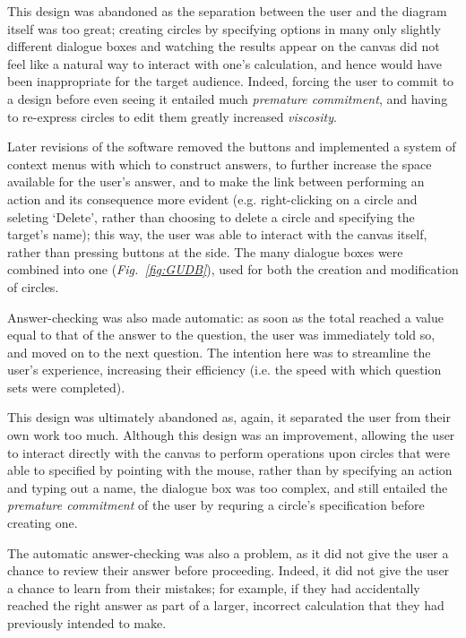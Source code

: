 \documentclass[12pt,twoside,notitlepage,xetex]{report}
\begin{document}
This design was abandoned as the separation between the user and the diagram itself was too great; creating circles by specifying options in many only slightly different dialogue boxes and watching the results appear on the canvas did not feel like a natural way to interact with one's calculation, and hence would have been inappropriate for the target audience.  Indeed, forcing the user to commit to a design before even seeing it entailed much \emph{premature commitment}, and having to re-express circles to edit them greatly increased \emph{viscosity}.

Later revisions of the software removed the buttons and implemented a system of context menus with which to construct answers, to further increase the space available for the user's answer, and to make the link between performing an action and its consequence more evident (e.g. right-clicking on a circle and seleting `Delete', rather than choosing to delete a circle and specifying the target's name); this way, the user was able to interact with the canvas itself, rather than pressing buttons at the side.  The many dialogue boxes were combined into one (\emph{Fig.~\ref{fig:GUDB}}), used for both the creation and modification of circles.

Answer-checking was also made automatic: as soon as the total reached a value equal to that of the answer to the question, the user was immediately told so, and moved on to the next question.  The intention here was to streamline the user's experience, increasing their efficiency (i.e. the speed with which question sets were completed).

This design was ultimately abandoned as, again, it separated the user from their own work too much.  Although this design was an improvement, allowing the user to interact directly with the canvas to perform operations upon circles that were able to specified by pointing with the mouse, rather than by specifying an action and typing out a name, the dialogue box was too complex, and still entailed the \emph{premature commitment} of the user by requring a circle's specification before creating one.

The automatic answer-checking was also a problem, as it did not give the user a chance to review their answer before proceeding.  Indeed, it did not give the user a chance to learn from their mistakes; for example, if they had accidentally reached the right answer as part of a larger, incorrect calculation that they had previously intended to make.
\end{document}
